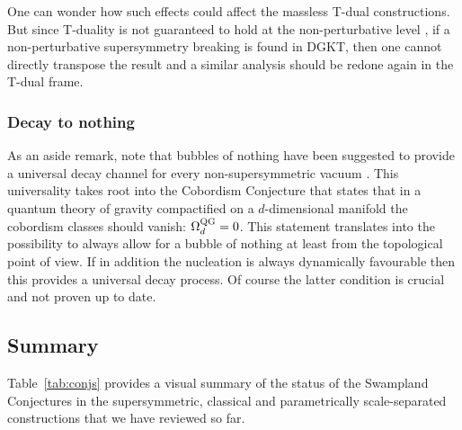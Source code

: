 \documentclass[11pt, a4paper]{article}
\begin{document}
One can wonder how such effects could affect the massless T-dual constructions. But since T-duality is not guaranteed to hold at the non-perturbative level \cite{Aspinwall:1999ii}, if a non-perturbative supersymmetry breaking is found in DGKT, then one cannot directly transpose the result and a similar analysis should be redone again in the T-dual frame.

\subsubsection{Decay to nothing}

As an aside remark, note that bubbles of nothing \cite{Witten:1981gj,Brill:1991qe,Fabinger:2000jd,Horowitz:2007pr,Blanco-Pillado:2010xww,Brown:2010mf,Brown:2011gt,Blanco-Pillado:2010vdp,Blanco-Pillado:2016xvf,Ooguri:2017njy,Acharya:2019mcu,Dibitetto:2020csn,Draper:2021qtc,Draper:2021ujg,Draper:2023ulp,Friedrich:2023tid} have been suggested to provide a universal decay channel for every non-supersymmetric vacuum \cite{GarciaEtxebarria:2020xsr}. This universality takes root into the Cobordism Conjecture \cite{McNamara:2019rup} that states that in a quantum theory of gravity compactified on a $d$-dimensional manifold the cobordism classes should vanish: $\Omega^{\rm QG}_d=0$. This statement translates into the possibility to always allow for a bubble of nothing at least from the topological point of view. If in addition the nucleation is always dynamically favourable then this provides a universal decay process. Of course the latter condition is crucial and not proven up to date.

\subsection{Summary}

Table~\ref{tab:conjs} provides a visual summary of the status of the Swampland Conjectures in the supersymmetric, classical and parametrically scale-separated constructions that we have reviewed so far.
\end{document}
